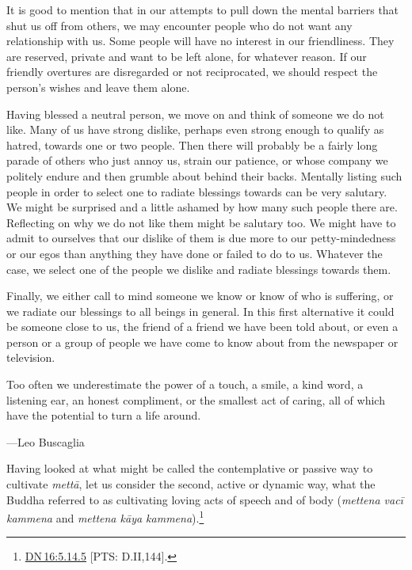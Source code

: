 \documentclass[10pt, openright]{book}
\newenvironment{epigram-2}%
{%
\setstretch{1.4}
\vspace{1em}
\noindent
\quoting[leftmargin=2cm,rightmargin=2cm]%
\begin{itshape}
\large
}%
{\end{itshape}\endquoting
}%
\newenvironment{epigram-2-cite}%
{%
\quoting[leftmargin=2cm,rightmargin=2cm]%
\noindent\normal\hspace*{\fill} 
}%
{\endquoting
}%
\begin{document}
It is good to mention that in our attempts to pull down the mental barriers that shut us off from others, we may encounter people who do not want any relationship with us. Some people will have no interest in our friendliness. They are reserved, private and want to be left alone, for whatever reason. If our friendly overtures are disregarded or not reciprocated, we should respect the person’s wishes and leave them alone.


Having blessed a neutral person, we move on and think of someone we do not like. Many of us have strong dislike, perhaps even strong enough to qualify as hatred, towards one or two people. Then there will probably be a fairly long parade of others who just annoy us, strain our patience, or whose company we politely endure and then grumble about behind their backs. Mentally listing such people in order to select one to radiate blessings towards can be very salutary. We might be surprised and a little ashamed by how many such people there are. Reflecting on why we do not like them might be salutary too. We might have to admit to ourselves that our dislike of them is due more to our petty-mindedness or our egos than anything they have done or failed to do to us. Whatever the case, we select one of the people we dislike and radiate blessings towards them.


Finally, we either call to mind someone we know or know of who is suffering, or we radiate our blessings to all beings in general. In this first alternative it could be someone close to us, the friend of a friend we have been told about, or even a person or a group of people we have come to know about from the newspaper or television.


\begin{epigram-2}
Too often we underestimate the power of a touch, a smile, a kind word, a listening ear, an honest compliment, or the smallest act of caring, all of which have the potential to turn a life around.
\end{epigram-2}
\begin{epigram-2-cite}
—Leo Buscaglia
\end{epigram-2-cite}

Having looked at what might be called the contemplative or passive way to cultivate \textit{mettā}, let us consider the second, active or dynamic way, what the Buddha referred to as cultivating loving acts of speech and of body (\textit{mettena vacī kammena} and \textit{mettena kāya kammena}).\footnote {\href{https://suttacentral.net/dn16/en/sujato\#5.14.5}{DN 16:5.14.5} [PTS: D.II,144].}
\end{document}

